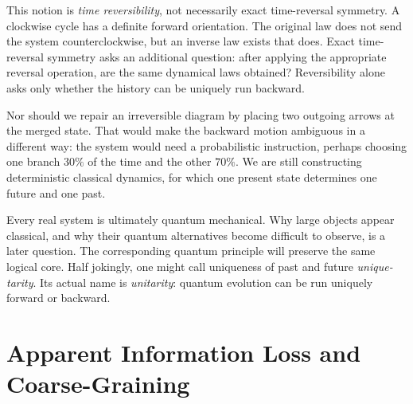 \begin{classroomqa}
\end{classroomqa}

This notion is \emph{time reversibility}, not necessarily exact time-reversal symmetry. A clockwise cycle has a definite forward orientation. The original law does not send the system counterclockwise, but an inverse law exists that does. Exact time-reversal symmetry asks an additional question: after applying the appropriate reversal operation, are the same dynamical laws obtained? Reversibility alone asks only whether the history can be uniquely run backward.

\begin{classroomqa}
\end{classroomqa}

Nor should we repair an irreversible diagram by placing two outgoing arrows at the merged state. That would make the backward motion ambiguous in a different way: the system would need a probabilistic instruction, perhaps choosing one branch \(30\%\) of the time and the other \(70\%\). We are still constructing deterministic classical dynamics, for which one present state determines one future and one past.

Every real system is ultimately quantum mechanical. Why large objects appear classical, and why their quantum alternatives become difficult to observe, is a later question. The corresponding quantum principle will preserve the same logical core. Half jokingly, one might call uniqueness of past and future \emph{unique-tarity}. Its actual name is \emph{unitarity}: quantum evolution can be run uniquely forward or backward.

\section{Apparent Information Loss and Coarse-Graining}

